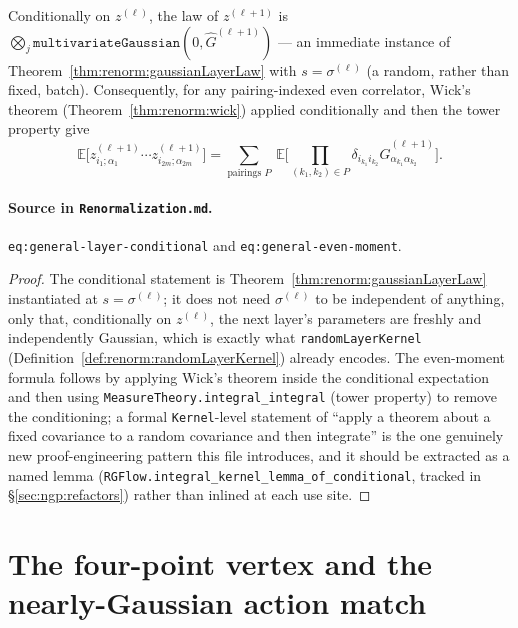 \begin{theorem}
\label{thm:ngp:generalEvenMoment}
Conditionally on $z^{(\ell)}$, the law of $z^{(\ell+1)}$ is
$\bigotimes_{j}\texttt{multivariateGaussian}(0,\widehat G^{(\ell+1)})$ — an immediate instance of
Theorem~\ref{thm:renorm:gaussianLayerLaw} with $s=\sigma^{(\ell)}$ (a random, rather than fixed,
batch). Consequently, for any pairing-indexed even correlator, Wick's theorem
(Theorem~\ref{thm:renorm:wick}) applied conditionally and then the tower property give
\[
  \mathbb E\big[z^{(\ell+1)}_{i_1;\alpha_1}\cdots z^{(\ell+1)}_{i_{2m};\alpha_{2m}}\big]
  =\sum_{\text{pairings }P}\ \mathbb E\Big[\textstyle\prod_{(k_1,k_2)\in P}
    \delta_{i_{k_1}i_{k_2}}\widehat G^{(\ell+1)}_{\alpha_{k_1}\alpha_{k_2}}\Big].
\]

\paragraph{Source in \texttt{Renormalization.md}.}
\texttt{eq:general-layer-conditional} and \texttt{eq:general-even-moment}.
\end{theorem}

\begin{proof}
The conditional statement is Theorem~\ref{thm:renorm:gaussianLayerLaw} instantiated at $s=\sigma^{(\ell)}$; it
does not need $\sigma^{(\ell)}$ to be independent of anything, only that, conditionally on
$z^{(\ell)}$, the next layer's parameters are freshly and independently Gaussian, which is exactly
what \texttt{randomLayerKernel} (Definition~\ref{def:renorm:randomLayerKernel}) already encodes.
The even-moment formula follows by applying Wick's theorem inside the conditional expectation and
then using \texttt{MeasureTheory.integral\_integral} (tower property) to remove the conditioning; a
formal \texttt{Kernel}-level statement of ``apply a theorem about a fixed covariance to a
random covariance and then integrate'' is the one genuinely new proof-engineering pattern this
file introduces, and it should be extracted as a named lemma
(\texttt{RGFlow.integral\_kernel\_lemma\_of\_conditional}, tracked in
\S\ref{sec:ngp:refactors}) rather than inlined at each use site.
\end{proof}

\section{The four-point vertex and the nearly-Gaussian action match}
\label{sec:ngp:vertex}

